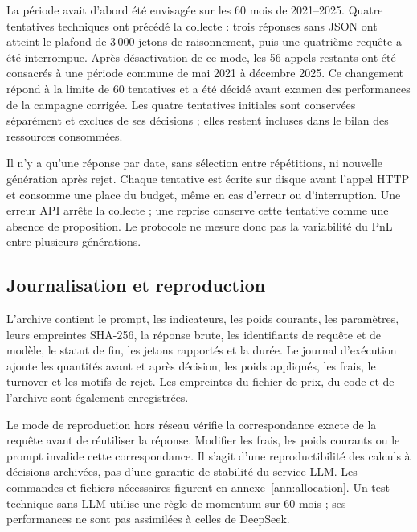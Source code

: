 La période avait d'abord été envisagée sur les 60 mois de 2021--2025. Quatre tentatives techniques ont précédé la collecte : trois réponses sans JSON ont atteint le plafond de 3\,000 jetons de raisonnement, puis une quatrième requête a été interrompue. Après désactivation de ce mode, les 56 appels restants ont été consacrés à une période commune de mai 2021 à décembre 2025. Ce changement répond à la limite de 60 tentatives et a été décidé avant examen des performances de la campagne corrigée. Les quatre tentatives initiales sont conservées séparément et exclues de ses décisions ; elles restent incluses dans le bilan des ressources consommées.

Il n'y a qu'une réponse par date, sans sélection entre répétitions, ni nouvelle génération après rejet. Chaque tentative est écrite sur disque avant l'appel HTTP et consomme une place du budget, même en cas d'erreur ou d'interruption. Une erreur API arrête la collecte ; une reprise conserve cette tentative comme une absence de proposition. Le protocole ne mesure donc pas la variabilité du PnL entre plusieurs générations.

\subsection{Journalisation et reproduction}

L'archive contient le prompt, les indicateurs, les poids courants, les paramètres, leurs empreintes SHA-256, la réponse brute, les identifiants de requête et de modèle, le statut de fin, les jetons rapportés et la durée. Le journal d'exécution ajoute les quantités avant et après décision, les poids appliqués, les frais, le turnover et les motifs de rejet. Les empreintes du fichier de prix, du code et de l'archive sont également enregistrées.

Le mode de reproduction hors réseau vérifie la correspondance exacte de la requête avant de réutiliser la réponse. Modifier les frais, les poids courants ou le prompt invalide cette correspondance. Il s'agit d'une reproductibilité des calculs à décisions archivées, pas d'une garantie de stabilité du service LLM. Les commandes et fichiers nécessaires figurent en annexe~\ref{ann:allocation}. Un test technique sans LLM utilise une règle de momentum sur 60 mois ; ses performances ne sont pas assimilées à celles de DeepSeek.
